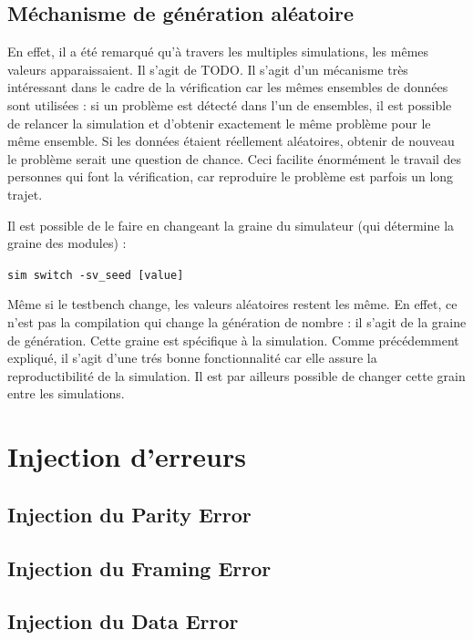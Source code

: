 \documentclass[12pt, titlepage]{article}
\begin{document}
    \subsection{Méchanisme de génération aléatoire}
    En effet, il a été remarqué qu'à travers les multiples simulations, les mêmes valeurs apparaissaient. Il s'agit de TODO. Il s'agit d'un mécanisme très intéressant dans le cadre de la vérification car les mêmes ensembles de données sont utilisées : si un problème est détecté dans l'un de ensembles, il est possible de relancer la simulation et d'obtenir exactement le même problème pour le même ensemble. Si les données étaient réellement aléatoires, obtenir de nouveau le problème serait une question de chance. Ceci facilite énormément le travail des personnes qui font la vérification, car reproduire le problème est parfois un long trajet.

    Il est possible de le faire en changeant la graine du simulateur (qui détermine la graine des modules) :

    \texttt{sim switch -sv\_seed [value]}
    
    Même si le testbench change, les valeurs aléatoires restent les même. En effet, ce n'est pas la compilation qui change la génération de nombre : il s'agit de la graine de génération. Cette graine est spécifique à la simulation. Comme précédemment expliqué, il s'agit d'une trés bonne fonctionnalité car elle assure la reproductibilité de la simulation. Il est par ailleurs possible de changer cette grain entre les simulations.
    

\section{Injection d'erreurs} 
    \subsection{Injection du Parity Error} \lipsum[3]
    \subsection{Injection du Framing Error} \lipsum[3]
    \subsection{Injection du Data Error} \lipsum[3]
\end{document}
